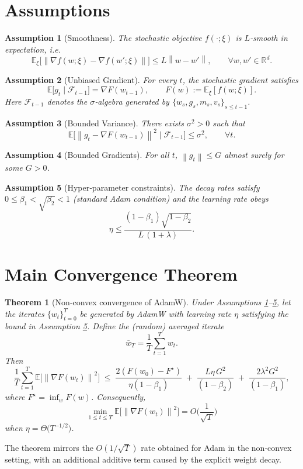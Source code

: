 \documentclass{article}
\newtheorem{theorem}{Theorem}
\newtheorem{assumption}{Assumption}
\newcommand{\E}{\mathbb{E}}
\newcommand{\R}{\mathbb{R}}
\newcommand{\norm}[1]{\left\lVert #1 \right\rVert}
\begin{document}
\section{Assumptions}
\label{sec:assumptions}
\begin{assumption}[Smoothness]\label{ass:smooth}
The stochastic objective $f(\cdot;\xi)$ is $L$‑smooth in expectation, i.e.
\[
    \E_{\xi}\!\big[\norm{\nabla f(w;\xi)-\nabla f(w';\xi)}\big] 
    \le L \norm{w-w'},\qquad\forall w,w'\in\R^d .
\]
\end{assumption}
\begin{assumption}[Unbiased Gradient]\label{ass:unbiased}
For every $t$, the stochastic gradient satisfies
\[
    \E\!\big[g_t\mid \mathcal{F}_{t-1}\big]=\nabla F(w_{t-1}),\qquad 
    F(w):=\E_{\xi}[f(w;\xi)] .
\]
Here $\mathcal{F}_{t-1}$ denotes the $\sigma$‑algebra generated by $\{w_s,g_s,m_s,v_s\}_{s\le t-1}$.
\end{assumption}
\begin{assumption}[Bounded Variance]\label{ass:variance}
There exists $\sigma^2>0$ such that
\[
    \E\!\big[\norm{g_t-\nabla F(w_{t-1})}^2\mid\mathcal{F}_{t-1}\big]
    \le\sigma^2,\qquad\forall t .
\]
\end{assumption}
\begin{assumption}[Bounded Gradients]\label{ass:bounded}
For all $t$, $\norm{g_t}\le G$ almost surely for some $G>0$.
\end{assumption}
\begin{assumption}[Hyper‑parameter constraints]\label{ass:params}
The decay rates satisfy $0\le\beta_1<\sqrt{\beta_2}<1$ (standard Adam condition) and the learning rate obeys
\[
    \eta \le \frac{(1-\beta_1)\sqrt{1-\beta_2}}{L\,(1+\lambda)} .
\]
\end{assumption}

\section{Main Convergence Theorem}
\label{sec:theorem}
\begin{theorem}[Non‑convex convergence of AdamW]\label{thm:adamw}
Under Assumptions \ref{ass:smooth}–\ref{ass:params}, let the iterates $\{w_t\}_{t=0}^{T}$ be generated by AdamW with learning rate $\eta$ satisfying the bound in Assumption \ref{ass:params}. Define the (random) averaged iterate
\[
    \bar w_T = \frac{1}{T}\sum_{t=1}^{T} w_{t}.
\]
Then
\[
    \frac{1}{T}\sum_{t=1}^{T}\E\!\big[\norm{\nabla F(w_{t})}^2\big]
    \;\le\;
    \frac{2(F(w_0)-F^\star)}{\eta (1-\beta_1)} 
    \;+\;
    \frac{L\eta\, G^2}{(1-\beta_2)} 
    \;+\;
    \frac{2\lambda^2 G^2}{(1-\beta_1)} ,
\tag{T1}
\]
where $F^\star=\inf_{w}F(w)$. Consequently,
\[
    \min_{1\le t\le T}\E\!\big[\norm{\nabla F(w_t)}^2\big]
    = O\!\bigg(\frac{1}{\sqrt{T}}\bigg)
\]
when $\eta = \Theta\!\big(T^{-1/2}\big)$.
\end{theorem}
The theorem mirrors the $O(1/\sqrt{T})$ rate obtained for Adam in the non‑convex setting, with an additional additive term caused by the explicit weight decay.
\end{document}
